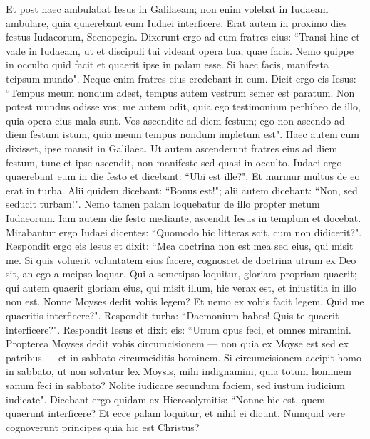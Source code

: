 \begin{biblechapter} 
\verse Et post haec ambulabat Iesus in Galilaeam; non enim volebat in Iudaeam ambulare, quia quaerebant eum Iudaei interficere. 
\verse Erat autem in proximo dies festus Iudaeorum, Scenopegia. 
\verse Dixerunt ergo ad eum fratres eius: “Transi hinc et vade in Iudaeam, ut et discipuli tui videant opera tua, quae facis. 
\verse Nemo quippe in occulto quid facit et quaerit ipse in palam esse. Si haec facis, manifesta teipsum mundo". 
\verse Neque enim fratres eius credebant in eum. 
\verse Dicit ergo eis Iesus: “Tempus meum nondum adest, tempus autem vestrum semer est paratum. 
\verse Non potest mundus odisse vos; me autem odit, quia ego testimonium perhibeo de illo, quia opera eius mala sunt. 
\verse Vos ascendite ad diem festum; ego non ascendo ad diem festum istum, quia meum tempus nondum impletum est". 
\verse Haec autem cum dixisset, ipse mansit in Galilaea. 
\verse Ut autem ascenderunt fratres eius ad diem festum, tunc et ipse ascendit, non manifeste sed quasi in occulto. 
\verse Iudaei ergo quaerebant eum in die festo et dicebant: “Ubi est ille?". 
\verse Et murmur multus de eo erat in turba. Alii quidem dicebant: “Bonus est!"; alii autem dicebant: “Non, sed seducit turbam!". 
\verse Nemo tamen palam loquebatur de illo propter metum Iudaeorum. 
\verse Iam autem die festo mediante, ascendit Iesus in templum et docebat. 
\verse Mirabantur ergo Iudaei dicentes: “Quomodo hic litteras scit, cum non didicerit?". 
\verse Respondit ergo eis Iesus et dixit: “Mea doctrina non est mea sed eius, qui misit me. 
\verse Si quis voluerit voluntatem eius facere, cognoscet de doctrina utrum ex Deo sit, an ego a meipso loquar. 
\verse Qui a semetipso loquitur, gloriam propriam quaerit; qui autem quaerit gloriam eius, qui misit illum, hic verax est, et iniustitia in illo non est. 
\verse Nonne Moyses dedit vobis legem? Et nemo ex vobis facit legem. Quid me quaeritis interficere?".  
\verse Respondit turba: “Daemonium habes! Quis te quaerit interficere?". 
\verse Respondit Iesus et dixit eis: “Unum opus feci, et omnes miramini. 
\verse Propterea Moyses dedit vobis circumcisionem — non quia ex Moyse est sed ex patribus — et in sabbato circumciditis hominem. 
\verse Si circumcisionem accipit homo in sabbato, ut non solvatur lex Moysis, mihi indignamini, quia totum hominem sanum feci in sabbato? 
\verse Nolite iudicare secundum faciem, sed iustum iudicium iudicate". 
\verse Dicebant ergo quidam ex Hierosolymitis: “Nonne hic est, quem quaerunt interficere? 
\verse Et ecce palam loquitur, et nihil ei dicunt. Numquid vere cognoverunt principes quia hic est Christus? 

\end{biblechapter}
